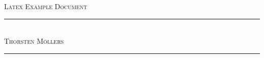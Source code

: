 \newcommand{\HRule}{\rule{\linewidth}{0.5mm}}
\begin{titlepage}
\begin{center}
\textsc{\huge Latex Example Document} \\[2cm]
\HRule \\[1cm]
\textsc{\large Thorsten M\"ollers} \\[1cm]
\HRule \\[1cm]
\end{center}
\end{titlepage}